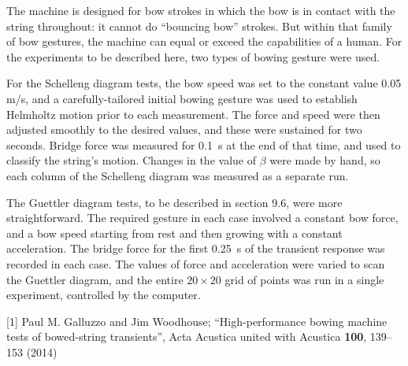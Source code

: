   The machine is designed for bow strokes in which the bow is in contact with 
  the string throughout: it cannot do “bouncing bow” strokes. But within that 
  family of bow gestures, the machine can equal or exceed the capabilities of a 
  human. For the experiments to be described here, two types of bowing gesture 
  were used. 

  For the Schelleng diagram tests, the bow speed was set to the constant value 
  0.05 m/s, and a carefully-tailored initial bowing gesture was used to 
  establish Helmholtz motion prior to each measurement. The force and speed 
  were then adjusted smoothly to the desired values, and these were sustained 
  for two seconds. Bridge force was measured for 0.1 s at the end of that time, 
  and used to classify the string’s motion. Changes in the value of $\beta$ 
  were made by hand, so each column of the Schelleng diagram was measured as a 
  separate run. 

  The Guettler diagram tests, to be described in section 9.6, were more 
  straightforward. The required gesture in each case involved a constant bow 
  force, and a bow speed starting from rest and then growing with a constant 
  acceleration. The bridge force for the first 0.25 s of the transient response 
  was recorded in each case. The values of force and acceleration were varied 
  to scan the Guettler diagram, and the entire $20 \times 20$ grid of points 
  was run in a single experiment, controlled by the computer. 

  \sectionreferences{}[1] Paul M. Galluzzo and Jim Woodhouse; 
  ``High-performance bowing machine tests of bowed-string transients'', Acta 
  Acustica united with Acustica \textbf{100}, 139--153 (2014) 